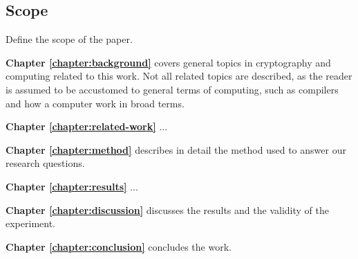 \subsection{Scope}

Define the scope of the paper.



\noindent\textbf{Chapter \ref{chapter:background}} covers general topics in cryptography and computing related to this work. Not all related topics are described, as the reader is assumed to be accustomed to general terms of computing, such as compilers and how a computer work in broad terms.

\noindent\textbf{Chapter \ref{chapter:related-work}} ...

\noindent\textbf{Chapter \ref{chapter:method}} describes in detail the method used to answer our research questions.

\noindent\textbf{Chapter \ref{chapter:results}} ...

\noindent\textbf{Chapter \ref{chapter:discussion}} discusses the results and the validity of the experiment.

\noindent\textbf{Chapter \ref{chapter:conclusion}} concludes the work.